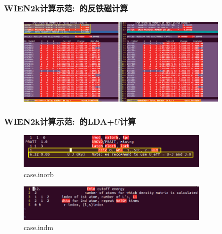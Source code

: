 \frame
{
	\frametitle{\textrm{WIEN2k}计算示范:~的反铁磁计算}
\vspace*{-8pt}
\begin{figure}[h!]
\centering
\includegraphics[width=4.1in]{Figures/WIEN2k_AFM_Cr-6.png}
\label{Fig:WIEN2k_AFM-Cr-6}
\end{figure}
{\fontsize{8.2pt}{6.2pt}}
}

\frame
{
	\frametitle{\textrm{WIEN2k}计算示范:~的\textrm{LDA+$U$}计算}
\vspace*{-2pt}
\begin{figure}[h!]
\centering
\includegraphics[width=3.7in]{Figures/WIEN2k_EuB6-inorb.png}
\caption{\tiny \textrm{case.inorb}}%
\label{Fig:WIEN2k_EuB6-inbor}
\end{figure}
\begin{figure}[h!]
\centering
\includegraphics[width=3.70in]{Figures/WIEN2k-indm.png}
\caption{\tiny \textrm{case.indm}}%
\label{Fig:WIEN2k_indm}
\end{figure}
}

